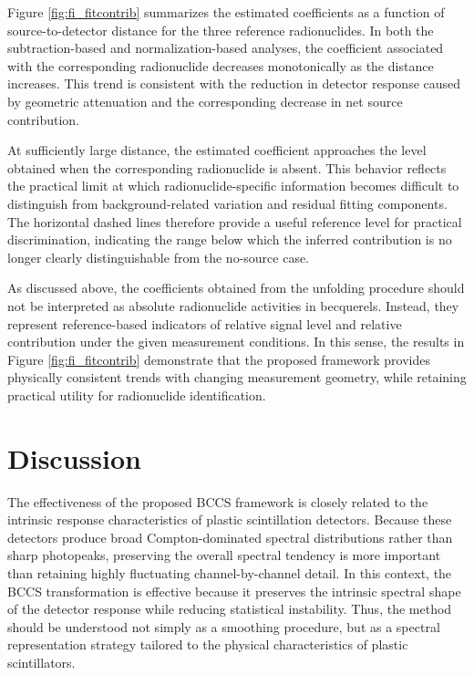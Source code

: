 \documentclass[10pt]{wlscirep}
\begin{document}
Figure \ref{fig:fi_fitcontrib} summarizes the estimated coefficients as a function of source-to-detector distance for the three reference radionuclides. In both the subtraction-based and normalization-based analyses, the coefficient associated with the corresponding radionuclide decreases monotonically as the distance increases. This trend is consistent with the reduction in detector response caused by geometric attenuation and the corresponding decrease in net source contribution.

At sufficiently large distance, the estimated coefficient approaches the level obtained when the corresponding radionuclide is absent. This behavior reflects the practical limit at which radionuclide-specific information becomes difficult to distinguish from background-related variation and residual fitting components. The horizontal dashed lines therefore provide a useful reference level for practical discrimination, indicating the range below which the inferred contribution is no longer clearly distinguishable from the no-source case.

As discussed above, the coefficients obtained from the unfolding procedure should not be interpreted as absolute radionuclide activities in becquerels. Instead, they represent reference-based indicators of relative signal level and relative contribution under the given measurement conditions. In this sense, the results in Figure \ref{fig:fi_fitcontrib} demonstrate that the proposed framework provides physically consistent trends with changing measurement geometry, while retaining practical utility for radionuclide identification.

\section*{Discussion}

The effectiveness of the proposed BCCS framework is closely related to the intrinsic response characteristics of plastic scintillation detectors. Because these detectors produce broad Compton-dominated spectral distributions rather than sharp photopeaks, preserving the overall spectral tendency is more important than retaining highly fluctuating channel-by-channel detail. In this context, the BCCS transformation is effective because it preserves the intrinsic spectral shape of the detector response while reducing statistical instability. Thus, the method should be understood not simply as a smoothing procedure, but as a spectral representation strategy tailored to the physical characteristics of plastic scintillators.
\end{document}
